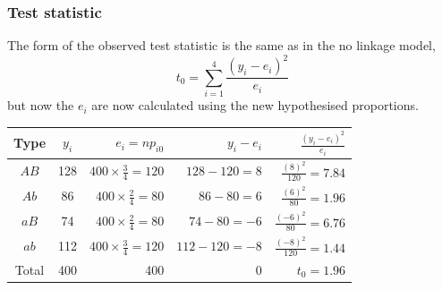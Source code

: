 \documentclass[a4paper]{article}
\begin{document}
\subsubsection{Test statistic}
The form of the observed test statistic is the same as in the no linkage model,
\[
	t_0 = \sum_{i=1}^{4} \frac{(y_i - e_i)^2}{e_i}
\]
but now the \( e_i \) are now calculated using the new hypothesised proportions.
\begin{table}[H]
	\centering
	\begin{tabular}{@{}ccrrr@{}}
	Type 	 & \( y_i \) & \( e_i = np_{i0} \) 				  & \( y_i - e_i \)      & \( \frac{(y_i - e_i)^2}{e_i} \)  \\ \midrule
	\( AB \) & 128  	 & \( 400 \times \frac{3}{4} = 120 \) & \( 128 - 120 = 8 \)  & \( \frac{(8)^2}{120} = 7.84 \)   \\
	\( Ab \) & 86  	     & \( 400 \times \frac{2}{4} = 80  \) & \( 86 - 80 = 6 \) 	 & \( \frac{(6)^2}{80} = 1.96 \)    \\
	\( aB \) & 74 	     & \( 400 \times \frac{2}{4} = 80  \) & \( 74 - 80 = -6 \) 	 & \( \frac{(-6)^2}{80} = 6.76 \)   \\
	\( ab \) & 112 	     & \( 400 \times \frac{3}{4} = 120 \) & \( 112 - 120 = -8 \) & \( \frac{(-8)^2}{120} = 1.44  \) \\ \midrule
	Total 	 & 400	     & 400	  				  		  	  & 0					 & \( t_0 = 1.96 \) 
	\end{tabular}
\end{table}
\end{document}
